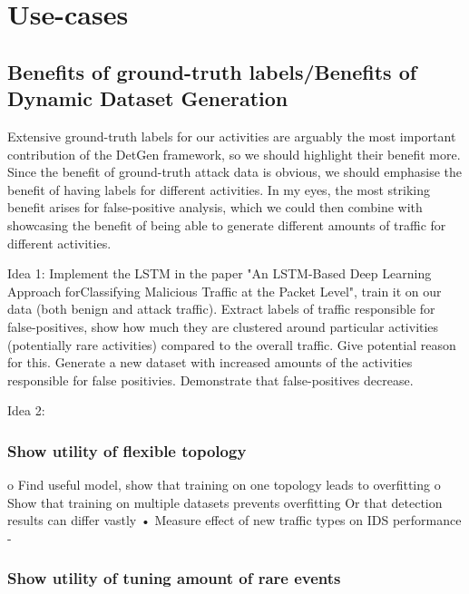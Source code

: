 \documentclass[sigconf]{acmart}
\begin{document}
\section{Use-cases}


\subsection{Benefits of ground-truth labels/Benefits of Dynamic Dataset Generation}

Extensive ground-truth labels for our activities are arguably the most important contribution of the DetGen framework, so we should highlight their benefit more. Since the benefit of ground-truth attack data is obvious, we should emphasise the benefit of having labels for different activities. In my eyes, the most striking benefit arises for false-positive analysis, which we could then combine with showcasing the benefit of being able to generate different amounts of traffic for different activities.


Idea 1: 
Implement the LSTM in the paper "An LSTM-Based Deep Learning Approach forClassifying Malicious Traffic at the Packet Level", train it on our data (both benign and attack traffic). Extract labels of traffic responsible for false-positives, show how much they are clustered around particular activities (potentially rare activities) compared to the overall traffic. Give potential reason for this. Generate a new dataset with increased amounts of the activities responsible for false positivies. Demonstrate that false-positives decrease.

Idea 2: 



\subsubsection{Show utility of flexible topology}
	o	Find useful model, show that training on one topology leads to overfitting
	o	Show that training on multiple datasets prevents overfitting
		Or that detection results can differ vastly
•	Measure effect of new traffic types on IDS performance
 	- 

\subsubsection{Show utility of tuning amount of rare events}
\end{document}
